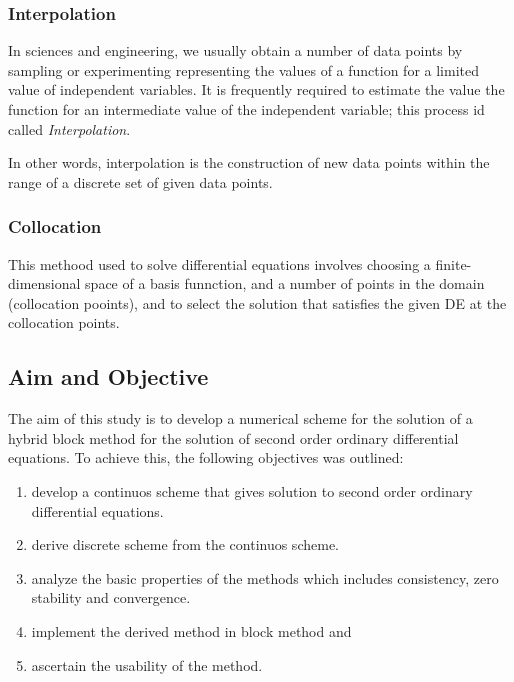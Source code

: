 \documentclass[12pt]{article}
\begin{document}
	\subsubsection{Interpolation}
	In sciences and engineering, we usually obtain a number of data points by sampling or experimenting representing the values of a function for a limited value of independent variables. It is frequently required to estimate the value the function for an intermediate value of the independent variable; this process id called \textsl{Interpolation}. 
	
	In other words, interpolation is the construction of new data points within the range of a discrete set of given data points.
	\subsubsection{Collocation}
	This methood used to solve differential equations involves choosing a finite-dimensional space of a basis funnction, and a number of points in the domain (collocation pooints), and to select the solution that satisfies the given DE at the collocation points.

\subsection{Aim and Objective}
	The aim of this study is to develop a numerical scheme for the solution of a hybrid block method for the solution of second order ordinary differential equations. To achieve this, the following objectives was outlined:
	\begin{enumerate}
		\item develop a continuos scheme that gives solution to second order ordinary differential equations.
		\item  derive discrete scheme from the continuos scheme.
		\item analyze the basic properties of the methods which includes consistency, zero stability and convergence.
		\item  implement the derived method in block method and
		\item  ascertain the usability of the method.
	\end{enumerate}

\bigskip

\bigskip

\bigskip
\bigskip
\end{document}
